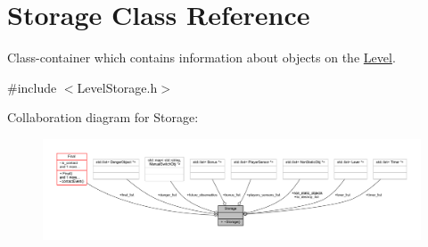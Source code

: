 \hypertarget{class_storage}{}\section{Storage Class Reference}
\label{class_storage}


Class-\/container which contains information about objects on the \hyperlink{class_level}{Level}.  




{\ttfamily \#include $<$Level\+Storage.\+h$>$}



Collaboration diagram for Storage\+:
\nopagebreak
\begin{figure}[H]
\begin{center}
\leavevmode
\includegraphics[width=350pt]{class_storage__coll__graph}
\end{center}
\end{figure}
